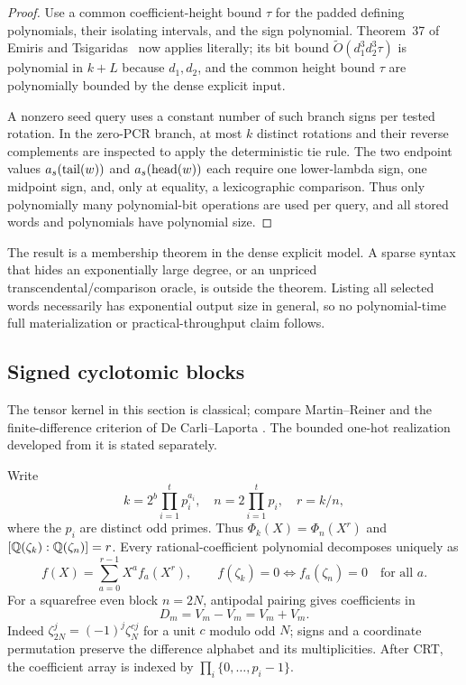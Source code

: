 \begin{proof}
Use a common coefficient-height bound $\tau$ for the padded defining
polynomials, their isolating intervals, and the sign polynomial.  Theorem~37
of Emiris and Tsigaridas~\cite{EmirisTsigaridas2005} now applies literally;
its bit bound $\widetilde O(d_1^3d_2^3\tau)$ is polynomial in $k+L$ because
$d_1,d_2$, and the common height bound $\tau$ are polynomially bounded by the
dense explicit input.

A nonzero seed query uses a constant number of such branch signs per tested
rotation.  In the zero-PCR branch, at most $k$ distinct rotations and their
reverse complements are inspected to apply the deterministic tie rule.  The
two endpoint values $a_s(\operatorname{tail}(w))$ and $a_s(\operatorname{head}(w))$ each require one
lower-lambda sign, one midpoint sign, and, only at equality, a lexicographic
comparison.  Thus only polynomially many polynomial-bit operations are used
per query, and all stored words and polynomials have polynomial size.
\end{proof}

The result is a membership theorem in the dense explicit model.  A sparse
syntax that hides an exponentially large degree, or an unpriced
transcendental/comparison oracle, is outside the theorem.  Listing all
selected words necessarily has exponential output size in general, so no
polynomial-time full materialization or practical-throughput claim follows.

\subsection{Signed cyclotomic blocks}\label{ext:sec:blocks}
The tensor kernel in this section is classical; compare Martin--Reiner \cite{MartinReiner2005} and the finite-difference criterion of De Carli--Laporta \cite{DeCarliLaporta2026}. The bounded one-hot realization developed from it is stated separately.

Write
\[
k=2^b\prod_{i=1}^t p_i^{a_i},\quad
n=2\prod_{i=1}^t p_i,\quad r=k/n,
\]
where the $p_i$ are distinct odd primes. Thus $\Phi_k(X)=\Phi_n(X^r)$ and $[\mathbb Q(\zeta_k):\mathbb Q(\zeta_n)]=r$. Every rational-coefficient polynomial decomposes uniquely as
\[
f(X)=\sum_{a=0}^{r-1}X^a f_a(X^r),\qquad
f(\zeta_k)=0\iff f_a(\zeta_n)=0\quad\text{for all }a.
\]
For a squarefree even block $n=2N$, antipodal pairing gives coefficients in
\[
D_m=V_m-V_m=V_m+V_m.
\]
Indeed $\zeta_{2N}^j=(-1)^j\zeta_N^{cj}$ for a unit $c$ modulo odd $N$; signs and a coordinate permutation preserve the difference alphabet and its multiplicities. After CRT, the coefficient array is indexed by $\prod_i\{0,\ldots,p_i-1\}$.

